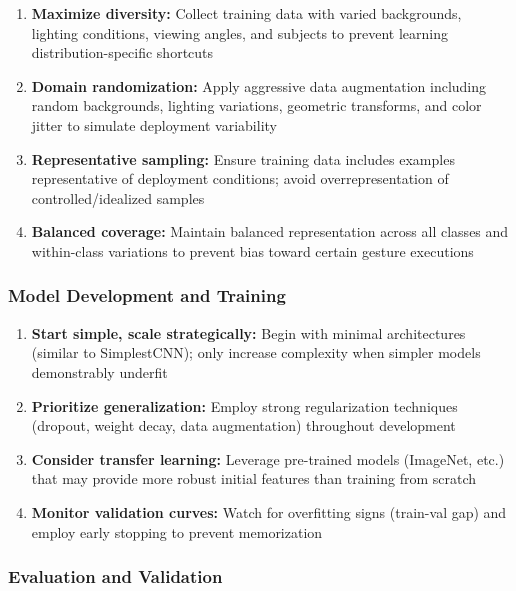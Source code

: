 \documentclass[12pt,a4paper]{article}
\begin{document}
\begin{enumerate}
    \item \textbf{Maximize diversity:} Collect training data with varied backgrounds, lighting conditions, viewing angles, and subjects to prevent learning distribution-specific shortcuts
    
    \item \textbf{Domain randomization:} Apply aggressive data augmentation including random backgrounds, lighting variations, geometric transforms, and color jitter to simulate deployment variability
    
    \item \textbf{Representative sampling:} Ensure training data includes examples representative of deployment conditions; avoid overrepresentation of controlled/idealized samples
    
    \item \textbf{Balanced coverage:} Maintain balanced representation across all classes and within-class variations to prevent bias toward certain gesture executions
\end{enumerate}

\subsubsection{Model Development and Training}

\begin{enumerate}
    \item \textbf{Start simple, scale strategically:} Begin with minimal architectures (similar to SimplestCNN); only increase complexity when simpler models demonstrably underfit
    
    \item \textbf{Prioritize generalization:} Employ strong regularization techniques (dropout, weight decay, data augmentation) throughout development
    
    \item \textbf{Consider transfer learning:} Leverage pre-trained models (ImageNet, etc.) that may provide more robust initial features than training from scratch
    
    \item \textbf{Monitor validation curves:} Watch for overfitting signs (train-val gap) and employ early stopping to prevent memorization
\end{enumerate}

\subsubsection{Evaluation and Validation}
\end{document}
